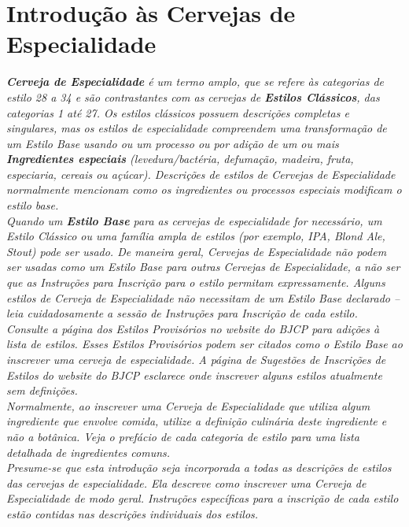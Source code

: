\section*{Introdução às Cervejas de Especialidade}
\textit{\textbf{Cerveja de Especialidade} é um termo amplo, que se refere às categorias de estilo 28 a 34 e são contrastantes com as cervejas de \textbf{Estilos Clássicos}, das categorias 1 até 27. Os estilos clássicos possuem descrições completas e singulares, mas os estilos de especialidade compreendem uma transformação de um Estilo Base usando ou um processo ou por adição de um ou mais \textbf{Ingredientes especiais} (levedura/bactéria, defumação, madeira, fruta, especiaria, cereais ou açúcar). Descrições de estilos de Cervejas de Especialidade normalmente mencionam como os ingredientes ou processos especiais modificam o estilo base.}\\
\textit{Quando um \textbf{Estilo Base} para as cervejas de especialidade for necessário, um Estilo Clássico ou uma família ampla de estilos (por exemplo, IPA, Blond Ale, Stout) pode ser usado. De maneira geral, Cervejas de Especialidade não podem ser usadas como um Estilo Base para outras Cervejas de Especialidade, a não ser que as Instruções para Inscrição para o estilo permitam expressamente. Alguns estilos de Cerveja de Especialidade não necessitam de um Estilo Base declarado – leia cuidadosamente a sessão de Instruções para Inscrição de cada estilo.}\\
\textit{Consulte a página dos Estilos Provisórios no website do BJCP para adições à lista de estilos. Esses Estilos Provisórios podem ser citados como o Estilo Base ao inscrever uma cerveja de especialidade. A página de Sugestões de Inscrições de Estilos do website do BJCP esclarece onde inscrever alguns estilos atualmente sem definições.}\\
\textit{Normalmente, ao inscrever uma Cerveja de Especialidade que utiliza algum ingrediente que envolve comida, utilize a definição culinária deste ingrediente e não a botânica. Veja o prefácio de cada categoria de estilo para uma lista detalhada de ingredientes comuns. }\\
\textit{Presume-se que esta introdução seja incorporada a todas as descrições de estilos das cervejas de especialidade. Ela descreve como inscrever uma Cerveja de Especialidade de modo geral. Instruções específicas para a inscrição de cada estilo estão contidas nas descrições individuais dos estilos.}\\
